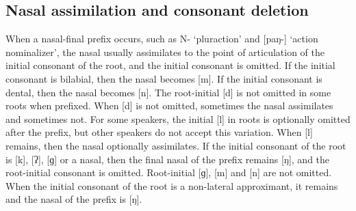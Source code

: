 \subsection{Nasal assimilation and consonant deletion}\label{nasal-assimilation} 

When a nasal-final prefix occurs, such as N- ‘pluraction’ and [paŋ-] ‘action nominalizer’, the nasal usually assimilates to the point of articulation of the initial consonant of the root, and the initial consonant is omitted. If the initial consonant is bilabial, then the nasal becomes [m]. If the initial consonant is dental, then the nasal becomes [n]. The root-initial [d] is not omitted in some roots when prefixed. When [d] is not omitted, sometimes the nasal assimilates and sometimes not. For some speakers, the initial [l] in roots is optionally omitted after the prefix, but other speakers do not accept this variation. When [l] remains, then the nasal optionally assimilates. If the initial consonant of the root is [k], [ʔ], [ɡ] or a nasal, then the final nasal of the prefix remains [ŋ], and the root-initial consonant is omitted. Root-initial [ɡ], [m] and [n] are not omitted. When the initial consonant of the root is a non-lateral approximant, it remains and the nasal of the prefix is [ŋ].
